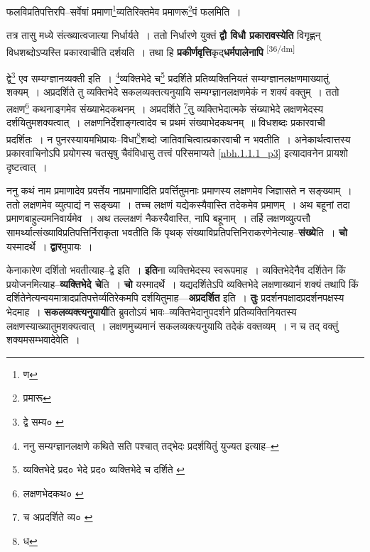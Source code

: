 \documentclass[article,12pt,a4paper]{memoir}
\begin{document}
	  \pstart फलविप्रतिपत्तिरपि--सर्वेषां प्रमाणा\footnote{ण}व्यतिरिक्तमेव प्रमाणरू\footnote{प्रमारू}पं फलमिति ।
	\pend
      

	  \pstart तत्र तासु मध्ये संत्ख्यात्वजात्या निर्धार्यते । ततो निर्धारणे युक्तं \textbf{द्वौ विधौ प्रकारावस्येति} विगृह्णन् विधशब्दोऽप्यस्ति प्रकारवाचीति दर्शयति । तथा हि \textbf{प्रकीर्णवृत्ति}कृद्\textbf{धर्मपालेनापि}  \leavevmode\textsuperscript{\rmlatinfont\tiny [36/dm]} 
	  
	द्वे\footnote{द्वे सम्य० \cite{dp-msA} \cite{dp-edP} \cite{dp-edE}} एव सम्यग्ज्ञानव्यक्ती इति । \footnote{ननु सम्यग्ज्ञानलक्षणे कथिते सति पश्चात् तद्भेदः प्रदर्शयितुं युज्यत इत्याह--\cite{dp-msD-n}}व्यक्तिभेदे च\footnote{व्यक्तिभेदे प्रद० \cite{dp-msA} \cite{dp-edP} \cite{dp-edH} \cite{dp-edE} \cite{dp-edN} भेदे प्रद० \cite{dp-msB} व्यक्तिभेदे च दर्शिते \cite{dp-msD}} प्रदर्शिते प्रतिव्यक्तिनियतं सम्यग्ज्ञानलक्षणमाख्यातुं शक्यम् । अप्रदर्शिते तु व्यक्तिभेदे सकलव्यक्तत्यनुयायि सम्यग्ज्ञानलक्षणमेकं न शक्यं वक्तुम् । ततो लक्षण\footnote{लक्षणभेदकथ० \cite{dp-msA} \cite{dp-msB} \cite{dp-msD} \cite{dp-edP} \cite{dp-edH} \cite{dp-edE} \cite{dp-edN}} कथनाङ्गमेव संख्याभेदकथनम् । अप्रदर्शिते \footnote{च \cite{dp-msC} अप्रदर्शिते व्य० \cite{dp-msA} \cite{dp-edE}}तु व्यक्तिभेदात्मके संख्याभेदे लक्षणभेदस्य दर्शयितुमशक्यत्वात् । लक्षणनिर्देशाङ्गत्वादेव च प्रथमं संख्याभेदकथनम् ॥ विधशब्दः प्रकारवाची प्रदर्शितः । न पुनरस्यायमभिप्रायः--विधा\footnote{ध}शब्दो जातिवाचित्वात्प्रकारवाची न भवतीति । अनेकार्थत्वात्तस्य प्रकारवाचिनोऽपि प्रयोगस्य चतसृषु चैवंविधासु तत्त्वं परिसमाप्यते \cref{nbh.1.1.1_p3} इत्यादावनेन प्रायशो दृष्टत्वात् ।
	\pend
      

	  \pstart ननु कथं नाम प्रमाणादेव प्रवर्त्तेय नाप्रमाणादिति प्रवर्त्तितुमनाः प्रमाणस्य लक्षणमेव जिज्ञासते न सङ्ख्याम् । ततो लक्षणमेव व्युत्पाद्यं न सङ्ख्या । तच्च लक्षणं यद्येकस्यैवास्ति तदेकमेव प्रमाणम् । अथ बहूनां तदा प्रमाणबाहुल्यमनिवार्यमेव । अथ तल्लक्षणं नैकस्यैवास्ति, नापि बहूनाम् । तर्हि लक्षणव्युत्पत्तौ सामर्थ्यात्संख्याविप्रतिपत्तिर्निराकृता भवतीति किं पृथक् संख्याविप्रतिपत्तिनिराकरणेनेत्याह--\textbf{संख्ये}ति । \textbf{चो} यस्मादर्थे । \textbf{द्वार}मुपायः ।
	\pend
      

	  \pstart केनाकारेण दर्शितो भवतीत्याह--द्वे इति । \textbf{इति}ना व्यक्तिभेदस्य स्वरूपमाह । व्यक्तिभेदेनैव दर्शितेन किं प्रयोजनमित्याह--\textbf{व्यक्तिभेदे चे}ति । \textbf{चो} यस्मादर्थे । यद्यदर्शितेऽपि व्यक्तिभेदे लक्षणाख्यानं शक्यं तथापि किं दर्शितेनेत्यन्वयमात्रादप्रतिपत्तेर्व्यतिरेकमपि दर्शयितुमाह—\textbf{अप्रदर्शित} इति । \textbf{तुः} प्रदर्शनपक्षादप्रदर्शनपक्षस्य भेदमाह । \textbf{सकलव्यक्त्यनुयायी}ति ब्रुवतोऽयं भावः--व्यक्तिभेदानुपदर्शने प्रतिव्यक्तिनियतस्य लक्षणस्याख्यातुमशक्यत्वात् । लक्षणमुच्यमानं सकलव्यक्त्यनुयायि तदेकं वक्तव्यम् । न च तद् वक्तुं शक्यमसम्भवादेवेति ।
	\pend
      
\end{document}

